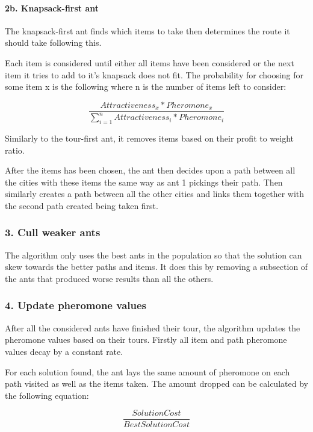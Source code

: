 \documentclass[a4paper,12pt]{article}
\begin{document}
\paragraph*{2b. Knapsack-first ant}

The knapsack-first ant finds which items to take then determines the route it should take following this.

Each item is considered until either all items have been considered or the next item it tries to add to it's knapsack does not fit. The probability for choosing for some item x is the following where n is the number of items left to consider:

\begin{equation}
\frac{Attractiveness_{x} * Pheromone_{x}}{\sum_{i = 1}^{n} Attractiveness_{i} * Pheromone_{i}}
\end{equation}

Similarly to the tour-first ant, it removes items based on their profit to weight ratio.

After the items has been chosen, the ant then decides upon a path between all the cities with these items the same way as ant 1 pickings their path. Then similarly creates a path between all the other cities and links them together with the second path created being taken first.

\subsubsection*{3. Cull weaker ants}

The algorithm only uses the best ants in the population so that the solution can skew towards the better paths and items. It does this by removing a subsection of the ants that produced worse results than all the others.

\subsubsection*{4. Update pheromone values}

After all the considered ants have finished their tour, the algorithm updates the pheromone values based on their tours. Firstly all item and path pheromone values decay by a constant rate.

For each solution found, the ant lays the same amount of pheromone on each path visited as well as the items taken. The amount dropped can be calculated by the following equation:

\begin{equation}
\frac{SolutionCost}{BestSolutionCost}
\end{equation}
\end{document}
